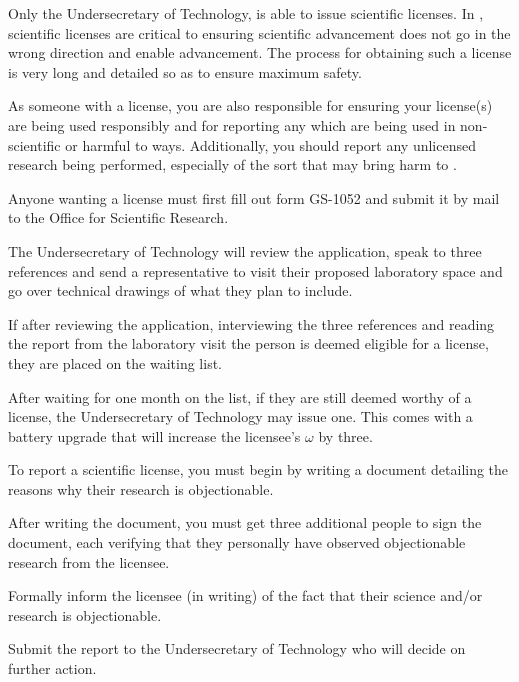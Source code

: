 \documentclass[green]{guildcamp3}
\begin{document}
	
	\name{\gSciLicense{}}
	
	Only the Undersecretary of Technology, \cPoliTwo{} is able to issue scientific licenses. In \bTechWorld{}, scientific licenses are critical to ensuring scientific advancement does not go in the wrong direction and enable advancement. The process for obtaining such a license is very long and detailed so as to ensure maximum safety. 
	
	As someone with a license, you are also responsible for ensuring your license(s) are being used responsibly and for reporting any which are being used in non-scientific or harmful to \bTechWorld{} ways. Additionally, you should report any unlicensed research being performed, especially of the sort that may bring harm to \bTechWorld{}.
	
	\begin{enum}
		\item \cSciOne{\intro}
		\item \cSciTwo{\intro}
	\end{enum}	
	
	
	\begin{enum}
		\item Anyone wanting a license must first fill out form GS-1052 and submit it by mail to the Office for Scientific Research. 
		\item The Undersecretary of Technology will review the application, speak to three references and send a representative to visit their proposed laboratory space and go over technical drawings of what they plan to include. 
		\item If after reviewing the application, interviewing the three references and reading the report from the laboratory visit the person is deemed eligible for a license, they are placed on the waiting list.
		\item After waiting for one month on the list, if they are still deemed worthy of a license, the Undersecretary of Technology may issue one. This comes with a battery upgrade that will increase the licensee's $\omega$ by three. 
	\end{enum}
	
	\begin{enum}
		\item To report a scientific license, you must begin by writing a document detailing the reasons why their research is objectionable.  
		\item After writing the document, you must get three additional people to sign the document, each verifying that they personally have observed objectionable research from the licensee.
		\item Formally inform the licensee (in writing) of the fact that their science and/or research is objectionable. 
		\item Submit the report to the Undersecretary of Technology who will decide on further action. 
	\end{enum}
\end{document}
